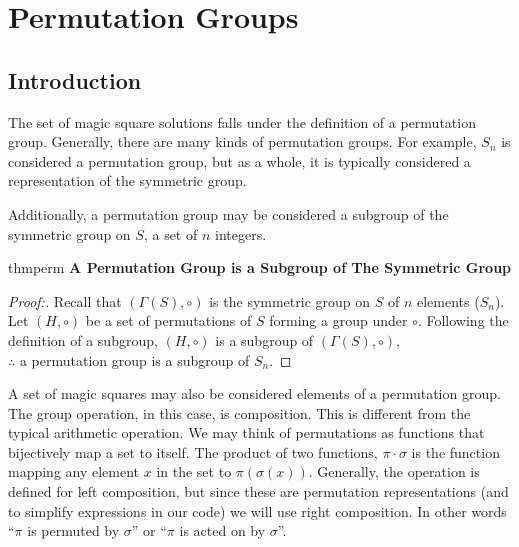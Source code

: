 \documentclass[12pt]{report}
\begin{document}
\chapter{Permutation Groups}

\section{Introduction}

\par The set of magic square solutions falls under the definition of a permutation group.
Generally, there are many kinds of permutation groups. For example, $S_n$ is considered a
permutation group, but as a whole, it is typically considered a representation of the symmetric
group.


\par Additionally, a permutation group may be considered a subgroup of the symmetric group on $S$,
a set of $n$ integers.

\singlespacing{}
\begin{thmbox}{}{thmperm}
  \textbf{A Permutation Group is a Subgroup of The Symmetric Group}
  \begin{proof}[Proof:]
    Recall that $\left(\varGamma\left(S\right), \circ \right)$ is the symmetric group on $S$ of $n$
    elements ($S_n$). Let $\left(H,\circ\right)$ be a set of permutations of $S$ forming a group
    under
    $\circ$. Following the definition of a subgroup, $\left(H,\circ\right)$ is a subgroup of
    $\left(\varGamma\left(S\right), \circ \right)$,\\ $\therefore$ a permutation group is a
    subgroup of
    $S_n$.
  \end{proof}
\end{thmbox}
\doublespacing{}

\par A set of magic squares may also be considered elements of a permutation group. The group
operation, in this case, is composition. This is different from the typical arithmetic operation.
We may think of permutations as functions that bijectively map a set to itself. The product of two
functions, $\pi\cdot\sigma$ is the function mapping any element $x$ in the set to
$\pi\left(\sigma\left(x\right)\right)$. Generally, the operation is defined for left composition,
but since these are permutation representations (and to simplify expressions in our code) we will
use right composition. In other words ``$\pi$ is permuted by $\sigma$'' or ``$\pi$ is acted on by
$\sigma$''.
\end{document}
